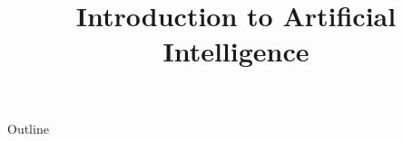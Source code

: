 \documentclass[xcolor=dvipsnames,compress,t,pdf,notes,9pt]{beamer}
\title[\insertframenumber /\inserttotalframenumber]{Introduction to Artificial Intelligence}
\begin{document}
	\begin{frame}
	\titlepage
	\end{frame}
	
	\begin{frame}{Outline}
	    \tableofcontents
	\end{frame}

	
	
	
\end{document}
